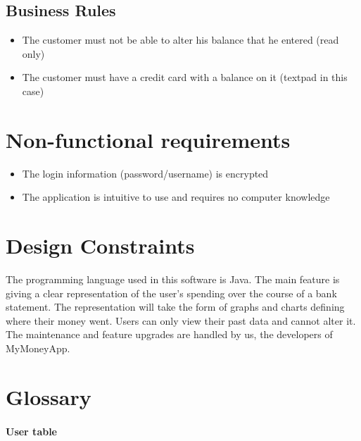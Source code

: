 \documentclass[letterpaper]{article}
\begin{document}
	\subsection{Business Rules}
	
		\begin{itemize}
			
			\item The customer must not be able to alter his balance that he entered (read only)
			
			\item The customer must have a credit card with a balance on it (textpad in this case)
			
		\end{itemize}
	
\section{Non-functional requirements}

	\begin{itemize}
		
		\item The login information (password/username) is encrypted 
		
		\item The application is intuitive to use and requires no computer knowledge
		
	\end{itemize}

\section{Design Constraints}

	The programming language used in this software is Java. The main feature is giving a clear representation of the user’s spending over the course of a bank statement. The representation will take the form of graphs and charts defining where their money went. Users can only view their past data and cannot alter it. The maintenance and feature upgrades are handled by us, the developers of MyMoneyApp.

\section{Glossary}

	\paragraph{User table}
	
\end{document}
